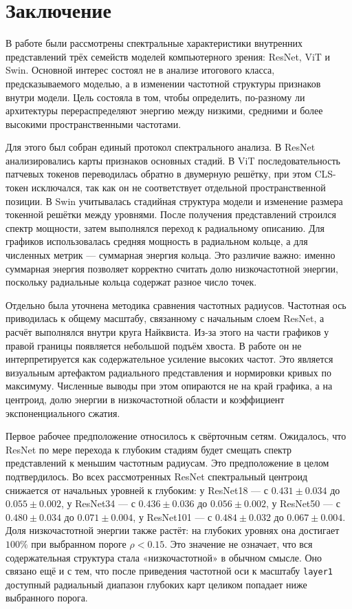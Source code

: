 \chapter{Заключение}

В работе были рассмотрены спектральные характеристики внутренних представлений трёх семейств моделей компьютерного зрения: ResNet, ViT и Swin. Основной интерес состоял не в анализе итогового класса, предсказываемого моделью, а в изменении частотной структуры признаков внутри модели. Цель состояла в том, чтобы определить, по-разному ли архитектуры перераспределяют энергию между низкими, средними и более высокими пространственными частотами.

Для этого был собран единый протокол спектрального анализа. В ResNet анализировались карты признаков основных стадий. В ViT последовательность патчевых токенов переводилась обратно в двумерную решётку, при этом CLS-токен исключался, так как он не соответствует отдельной пространственной позиции. В Swin учитывалась стадийная структура модели и изменение размера токенной решётки между уровнями. После получения представлений строился спектр мощности, затем выполнялся переход к радиальному описанию. Для графиков использовалась средняя мощность в радиальном кольце, а для численных метрик --- суммарная энергия кольца. Это различие важно: именно суммарная энергия позволяет корректно считать долю низкочастотной энергии, поскольку радиальные кольца содержат разное число точек.

Отдельно была уточнена методика сравнения частотных радиусов. Частотная ось приводилась к общему масштабу, связанному с начальным слоем ResNet, а расчёт выполнялся внутри круга Найквиста. Из-за этого на части графиков у правой границы появляется небольшой подъём хвоста. В работе он не интерпретируется как содержательное усиление высоких частот. Это является визуальным артефактом радиального представления и нормировки кривых по максимуму. Численные выводы при этом опираются не на край графика, а на центроид, долю энергии в низкочастотной области и коэффициент экспоненциального сжатия.

Первое рабочее предположение относилось к свёрточным сетям. Ожидалось, что ResNet по мере перехода к глубоким стадиям будет смещать спектр представлений к меньшим частотным радиусам. Это предположение в целом подтвердилось. Во всех рассмотренных ResNet спектральный центроид снижается от начальных уровней к глубоким: у ResNet18 --- с $0.431\pm0.034$ до $0.055\pm0.002$, у ResNet34 --- с $0.436\pm0.036$ до $0.056\pm0.002$, у ResNet50 --- с $0.480\pm0.034$ до $0.071\pm0.004$, у ResNet101 --- с $0.484\pm0.032$ до $0.067\pm0.004$. Доля низкочастотной энергии также растёт: на глубоких уровнях она достигает $100\%$ при выбранном пороге $\rho<0.15$. Это значение не означает, что вся содержательная структура стала «низкочастотной» в обычном смысле. Оно связано ещё и с тем, что после приведения частотной оси к масштабу \texttt{layer1} доступный радиальный диапазон глубоких карт целиком попадает ниже выбранного порога.

